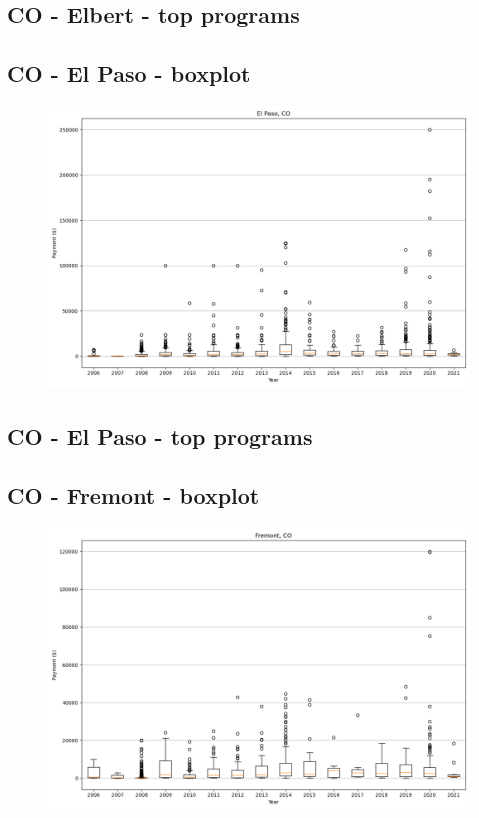 \subsection*{CO - Elbert - top programs}

\newpage
\subsection*{CO - El Paso - boxplot}
\begin{figure}[h]
\centering
\includegraphics[width=7in]{../output/boxplots/counties/El Paso-CO_boxplot.png}
\end{figure}


\subsection*{CO - El Paso - top programs}

\newpage
\subsection*{CO - Fremont - boxplot}
\begin{figure}[h]
\centering
\includegraphics[width=7in]{../output/boxplots/counties/Fremont-CO_boxplot.png}
\end{figure}


